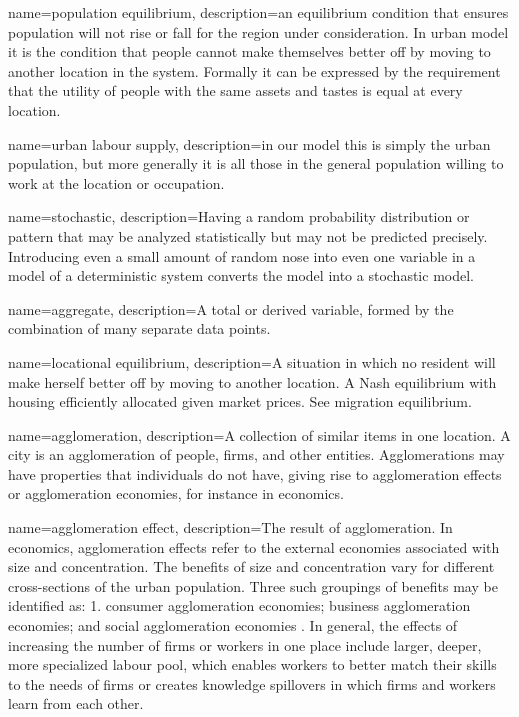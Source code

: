 {
name=population equilibrium,
description={an \gls{equilibrium condition} that ensures population will not rise or fall  for the region under consideration. In urban model it is the condition that people cannot make themselves better off by moving to another location in the system. Formally it can be expressed by the requirement that the utility of people with the same  assets and tastes is equal at every location. }
}

{
name=urban labour supply,
description={in our model this is simply the urban population, but more generally it is all those in the general population willing to work at the location or occupation.}
}

{
name=stochastic,
description={Having a random probability distribution or pattern that may be analyzed statistically but may not be predicted precisely. Introducing even a small amount of random nose into even one variable in a model of a deterministic system converts the model into a stochastic model.}
}

{
name=aggregate,
description={A total or derived variable, formed by the combination of many separate data points.}
}

{
name=locational equilibrium,
description={A situation in which no resident will make herself better off by moving to another location. A Nash equilibrium with housing efficiently allocated  given market prices. See \gls{migration equilibrium}.}
}

{
name=agglomeration,
description={A collection of similar items in one location. A city is an agglomeration of people, firms, and other entities. Agglomerations may have properties that individuals do not have, giving rise to \glspl{agglomeration effect} or \gls{agglomeration economies}, for instance in economics.}
}

{
name=agglomeration effect,
description={The result of \gls{agglomeration}. In economics, \glspl{agglomeration effect} refer to the external economies associated with size and concentration. The benefits of size and concentration vary for different cross-sections of the urban population. Three such groupings of benefits may be identified as: 1. consumer agglomeration economies; business agglomeration economies; and social agglomeration economies \cite{carlinoAgglomerationEconomiesSurvey1978}. In general, the effects of increasing the number of firms or workers in one place include larger, deeper, more specialized labour pool, which enables workers to better match their skills to the needs of firms or creates knowledge spillovers in which firms and workers learn from each other.}
}

